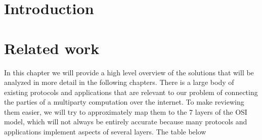 \tableofcontents

\printnoidxglossary[type=\acronymtype,title=List of Abbreviations]
\listoffigures

\mainmatter

\hypertarget{introduction}{%
\chapter{Introduction}\label{introduction}}

\hypertarget{related-work}{%
\chapter{Related work}\label{related-work}}

In this chapter we will provide a high level overview of the solutions
that will be analyzed in more detail in the following chapters. There is
a large body of existing protocols and applications that are relevant to
our problem of connecting the parties of a multiparty computation over
the internet. To make reviewing them easier, we will try to
approximately map them to the 7 layers of the OSI model, which will not
always be entirely accurate because many protocols and applications
implement aspects of several layers. The table below

